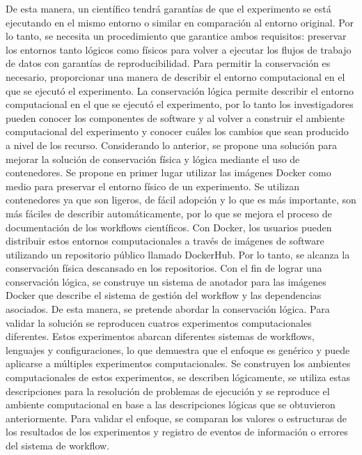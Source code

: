 De esta manera, un científico tendrá garantías de que el experimento se está ejecutando en el mismo entorno o similar en comparación al entorno original.
Por lo tanto, se necesita un procedimiento que garantice ambos requisitos: preservar los entornos tanto lógicos como físicos para volver a ejecutar los flujos de trabajo de datos con garantías de reproducibilidad.
Para permitir la conservación es necesario, proporcionar una manera de describir el entorno computacional en el que se ejecutó el experimento. 
La conservación lógica permite describir el entorno computacional en el que se ejecutó el experimento, por lo tanto los investigadores pueden conocer los componentes de software y al volver a construir el ambiente computacional del experimento y conocer cuáles los cambios que sean producido a nivel de los recurso.
Considerando lo anterior, se propone una solución para mejorar la solución de conservación física y lógica mediante el uso de contenedores.
Se propone en primer lugar utilizar las imágenes Docker como medio para preservar el entorno físico de un experimento. Se utilizan contenedores ya que son ligeros, de fácil adopción y lo que es más importante, son más fáciles de describir automáticamente, por lo que se mejora el proceso de documentación de los workflows científicos.
Con Docker, los usuarios pueden distribuir estos entornos computacionales a través de imágenes de software utilizando un repositorio público llamado DockerHub. Por lo tanto, se alcanza la conservación física descansado en los repositorios.
Con el fin de lograr una conservación lógica, se construye un sistema de anotador para las imágenes Docker que describe el sistema de gestión del workflow y las dependencias asociados. De esta manera, se pretende abordar la conservación lógica.
Para validar la solución se reproducen cuatros experimentos computacionales diferentes. Estos experimentos abarcan diferentes sistemas de workflows, lenguajes y configuraciones, lo que demuestra que el enfoque es genérico y puede aplicarse a múltiples experimentos computacionales.
Se construyen los ambientes computacionales de estos experimentos, se describen lógicamente, se utiliza estas descripciones para la resolución de problemas de ejecución y se reproduce el ambiente computacional en base a las descripciones lógicas que se obtuvieron anteriormente.
Para validar el enfoque, se comparan los valores o estructuras de los resultados de los experimentos y registro de eventos de información o errores del sistema de workflow.